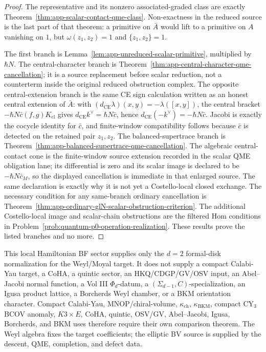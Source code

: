 \documentclass[11pt]{memoir}
\begin{document}
\begin{proof}
  The representative and its nonzero associated-graded class are exactly
  Theorem~\ref{thm:app-scalar-contact-qme-class}.  Non-exactness in the
  reduced source is the last part of that theorem: a primitive on
  \(\bar A\) would lift to a primitive on \(A\) vanishing on \(1\), but
  \(\omega(z_1,z_2)=1\) and \(\{z_1,z_2\}=1\).

  The first branch is Lemma~\ref{lem:app-unreduced-scalar-primitive},
  multiplied by \(\hbar N\).  The central-character branch is
  Theorem~\ref{thm:app-central-character-qme-cancellation}; it is a
  source replacement before scalar reduction, not a counterterm inside the
  original reduced obstruction complex.  The opposite central-extension
  branch is the same CE sign calculation written as an honest central
  extension of \(\bar A\): with
  \((d_{\mathrm{CE}}\lambda)(x,y)=-\lambda([x,y])\), the central bracket
  \(-\hbar N\bar c(f,g)K_{\mathrm{cl}}\) gives
  \(d_{\mathrm{CE}}k^\vee=\hbar N\bar c\), hence
  \(d_{\mathrm{CE}}(-k^\vee)=-\hbar N\bar c\).  Jacobi is exactly the
  cocycle identity for \(\bar c\), and finite-window compatibility follows
  because \(\bar c\) is detected on the retained pair \(z_1,z_2\).  The
  balanced-supertrace branch is
  Theorem~\ref{thm:app-balanced-supertrace-qme-cancellation}.  The
  algebraic central-contact cone is the finite-window source extension
  recorded in the scalar QME obligation lane; its differential is zero and
  its scalar image is declared to be \(-\hbar N\bar c_M\), so the displayed
  cancellation is immediate in that enlarged source.  The same declaration
  is exactly why it is not yet a Costello-local closed exchange.  The
  necessary condition for any same-branch ordinary cancellation is
  Theorem~\ref{thm:app-ordinary-glN-scalar-obstruction-criterion}.  The
  additional Costello-local image and scalar-chain obstructions are the
  filtered Hom conditions in
  Problem~\ref{prob:quantum-p0-operation-realization}.  These results prove
  the listed branches and no more.
\end{proof}

\begin{rmk}
  This local Hamiltonian BF sector supplies only the \(d=2\)
  formal-disk normalization for the Weyl/Moyal target.  It does not
  supply a compact Calabi-Yau target, a CoHA, a quintic sector, an
  HKQ/CDGP/GV/OSV input, an Abel--Jacobi normal function, a Vol III
  \(\Phi_d\)-datum, a \((\Sigma_{d-1},C)\)-specialization, an Igusa
  product lattice, a Borcherds Weyl chamber, or a BKM orientation
  character.  Compact Calabi-Yau, MNOP/chiral-volume,
  \(\kappa_{\mathrm{ch}}\), \(\kappa_{\mathrm{BKM}}\), compact
  CY\(_3\) BCOV anomaly, \(K3\times E\), CoHA, quintic, OSV/GV,
  Abel--Jacobi, Igusa, Borcherds, and BKM uses therefore require their
  own comparison theorem.
  The Weyl algebra fixes the target coefficients; the elliptic BV
  source is supplied by the descent, QME, completion, and defect data.
\end{rmk}
\end{document}
